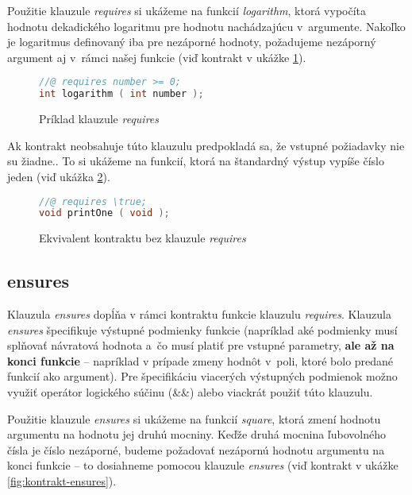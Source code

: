 Použitie klauzule \emph{requires} si ukážeme na funkcií \emph{logarithm}, ktorá vypočíta hodnotu dekadického logaritmu pre hodnotu nachádzajúcu v~argumente. Nakoľko je logaritmus definovaný iba pre nezáporné hodnoty, požadujeme nezáporný argument aj v~rámci našej funkcie (viď kontrakt v ukážke \ref{fig:kontrakt-requires}).

\begin{figure}[H]
    \centering
    \captionsetup{justification=centering}
\begin{lstlisting}[language=C]
//@ requires number >= 0;
int logarithm ( int number );
\end{lstlisting}
    \caption{Príklad klauzule \emph{requires}}
    \label{fig:kontrakt-requires}
\end{figure}

Ak kontrakt neobsahuje túto klauzulu predpokladá sa, že vstupné požiadavky nie su žiadne.\cite{default-requires-acsl}. To si ukážeme na funkcií, ktorá na štandardný výstup vypíše číslo jeden (viď ukážka \ref{fig:kontrakt-bez-requires}).

\begin{figure}[H]
    \centering
    \captionsetup{justification=centering}
\begin{lstlisting}[language=C]
//@ requires \true;
void printOne ( void );
\end{lstlisting}
    \caption{Ekvivalent kontraktu bez klauzule \emph{requires}}
    \label{fig:kontrakt-bez-requires}
\end{figure}

\subsection{ensures} \label{chapter:ensures}

Klauzula \emph{ensures} dopĺňa v rámci kontraktu funkcie klauzulu \emph{requires}. Klauzula \emph{ensures} špecifikuje výstupné podmienky funkcie (napríklad aké podmienky musí splňovať návratová hodnota a~čo musí platiť pre vstupné parametry, \textbf{ale až na konci funkcie} -- napríklad v prípade zmeny hodnôt v~poli, ktoré bolo predané funkcií ako argument). Pre špecifikáciu viacerých výstupných podmienok možno využiť operátor logického súčinu (\&\&) alebo viackrát použiť túto klauzulu.

Použitie klauzule \emph{ensures} si ukážeme na funkcií \emph{square}, ktorá zmení hodnotu argumentu na hodnotu jej druhú mocniny. Keďže druhá mocnina ľubovolného čísla je číslo nezáporné, budeme požadovať nezápornú hodnotu argumentu na konci funkcie -- to dosiahneme pomocou klauzule \emph{ensures} (viď kontrakt v ukážke \ref{fig:kontrakt-ensures}).

